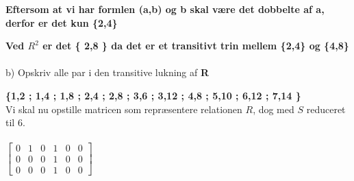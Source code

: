 \documentclass{article}
\begin{document}
\textbf{Eftersom at vi har formlen (a,b) og b skal være det dobbelte af a, derfor er det kun \{2,4\}}

\textbf{Ved $R^2$ er det \{ 2,8 \} da det er et transitivt trin mellem \{2,4\} og \{4,8\} }
\\
\\
b) Opskriv alle par i den transitive lukning af \textbf{R}

\textbf{\{1,2 ; 1,4 ; 1,8 ; 2,4 ; 2,8 ;  3,6 ; 3,12 ; 4,8 ; 5,10 ; 6,12 ; 7,14 \}}
\\

Vi skal nu opstille matricen som repræsentere relationen $R$, dog med $S$ reduceret til 6.
\\
\\
\begin{math}
\begin{bmatrix}
0 & 1 & 0 & 1 & 0 & 0\\
0 & 0 & 0 & 1 & 0 & 0\\
0 & 0 & 0 & 1 & 0 & 0
\end{bmatrix}
\end{math}
\end{document}

